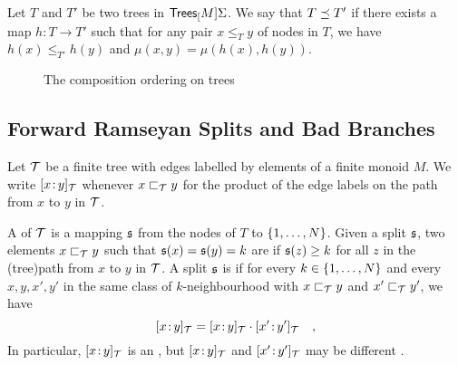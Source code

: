 \AP
\begin{definition}
    \label{composition-ordering:def}
    Let $T$ and $T'$ be two trees in $\mathsf{Trees}_{[}M]{\Sigma}$. We say that $T \preceq T'$
    if there exists a map $h \colon T \to T'$ such that
    for any pair $x \leq_T y$ of nodes in $T$,
    we have $h(x) \leq_{T'} h(y)$ and
    $\mu(x,y) = \mu(h(x), h(y))$.
\end{definition}



\begin{figure}
    \centering
    \caption{The composition ordering on trees}
    \label{composition-ordering:fig}
\end{figure}

\subsection{Forward Ramseyan Splits and Bad Branches}


\def\t{\aTree}

\AP Let $\t$ be a finite tree with edges labelled by elements of a finite
monoid $M$. We write $\tlbl{\t}{x}{y}$ whenever $x \treelt[\t] y$ for the
product of the edge labels on the path from $x$ to $y$ in $\t$.

A  of $\t$ is a mapping $\mathfrak{s}$ from the
nodes of $T$ to $\{ 1, \dots, N \}$. Given a split $\mathfrak{s}$, two elements $x
\treelt[\t] y$ such that $\mathfrak{s}(x) = \mathfrak{s}(y) = k$ are  if
$\mathfrak{s}(z) \geq k$ for all $z$ in the \kl(tree){path} from $x$ to $y$ in $\t$. A
split $\mathfrak{s}$ is  if for every $k \in \{ 1, \dots, N \}$ and
every $x, y, x', y'$ in the same class of $k$-neighbourhood with $x \treelt[\t] y$
and $x' \treelt[\t] y'$, we have 
\begin{equation} 
    \label{fake-idempotent:eq}
    \tlbl{\t}{x}{y} = \tlbl{\t}{x}{y} \cdot \tlbl{\t}{x'}{y'} \quad ,
\end{equation}
In particular, $\tlbl{\t}{x}{y}$ is an ,
but $\tlbl{\t}{x}{y}$ and $\tlbl{\t}{x'}{y'}$ may be different .

